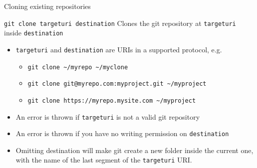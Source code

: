 \documentclass[presentation]{beamer}
\begin{document}
\begin{frame}{Cloning existing repositories}
    \begin{block}{\texttt{git clone targeturi destination}}
        Clones the git repository at \texttt{targeturi} inside \texttt{destination}
        \begin{itemize}
            \item \texttt{targeturi} and \texttt{destination} are URIs in a supported protocol, e.g.
            \begin{itemize}
                \item \texttt{git clone \textasciitilde/myrepo \textasciitilde/myclone}
                \item \texttt{git clone git@myrepo.com:myproject.git \textasciitilde/myproject}
                \item \texttt{git clone https://myrepo.mysite.com \textasciitilde/myproject}
            \end{itemize}
            \item An error is thrown if \texttt{targeturi} is not a valid git repository
            \item An error is thrown if you have no writing permission on \texttt{destination}
            \item Omitting destination will make git create a new folder inside the current one, with the name of the last segment of the \texttt{targeturi} URI.
        \end{itemize}
    \end{block}
\end{frame}
\end{document}
